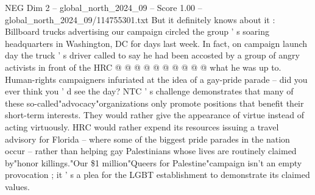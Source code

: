 \begin{textsample}{NEG Dim 2 – global\_north\_2024\_09 – Score 1.00 – global\_north\_2024\_09/114755301.txt}
But it definitely knows about it : Billboard trucks advertising our campaign circled the group ' s soaring headquarters in Washington, DC for days last week.
In fact, on campaign launch day the truck ' s driver called to say he had been accosted by a group of angry activists in front of the HRC @ @ @ @ @ @ @ @ @ @ what he was up to.
Human-rights campaigners infuriated at the idea of a gay-pride parade -- did you ever think you ' d see the day?
NTC ' s challenge demonstrates that many of these so-called"advocacy"organizations only promote positions that benefit their short-term interests.
They would rather give the appearance of virtue instead of acting virtuously.
HRC would rather expend its resources issuing a travel advisory for Florida -- where some of the biggest pride parades in the nation occur -- rather than helping gay Palestinians whose lives are routinely claimed by"honor killings."Our \$1 million"Queers for Palestine"campaign isn't an empty provocation ; it ' s a plea for the LGBT establishment to demonstrate its claimed values.

\end{textsample}
